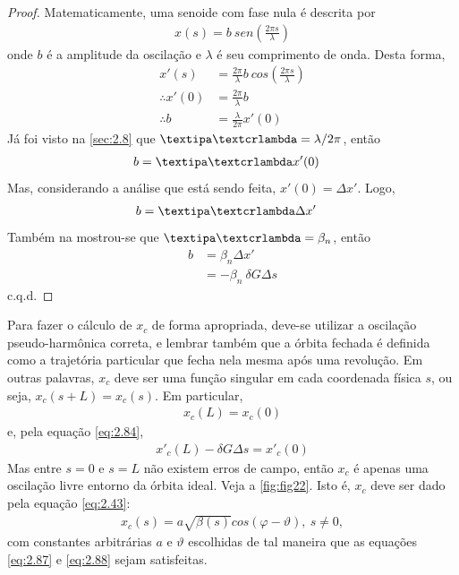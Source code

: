 \begin{proof}
	Matematicamente, uma senoide com fase nula é descrita por
	\begin{align*}
		x(s) = b\ sen\left(\frac{2\pi s}{\lambda}\right)
	\end{align*}
	onde $b$ é a amplitude da oscilação e $\lambda$ é seu comprimento de onda. Desta forma,
	\begin{align*}
		x'(s) &= \frac{2\pi}{\lambda}b\ cos\left(\frac{2\pi s}{\lambda}\right)\\
		\therefore x'(0) & = \frac{2\pi}{\lambda}b\\
		\therefore b &= \frac{\lambda}{2\pi}x'(0)
	\end{align*}
	Já foi visto na \autoref{sec:2.8} que $\lambdabar = \lambda/2\pi$, então
	\begin{align*}
		b &= \lambdabar x'(0)
	\end{align*}
	Mas, considerando a análise que está sendo feita, $x'(0) = \Delta x'$. Logo,
	\begin{align*}
		b &= \lambdabar \Delta x'
	\end{align*}
	Também na  mostrou-se que $\lambdabar = \beta_n$, então
	\begin{align*}
		b &= \beta_n \Delta x'\\
		  &= -\beta_n\ \delta G \Delta s
	\end{align*}
	c.q.d.
\end{proof}

Para fazer o cálculo de $x_c$ de forma apropriada, deve-se utilizar a oscilação pseudo-harmônica correta, e lembrar também que a órbita fechada é definida como a trajetória particular que fecha nela mesma após uma revolução. Em outras palavras, $x_c$ deve ser uma função singular em cada coordenada física $s$, ou seja, $x_c(s+L) = x_c(s)$. Em particular,
\begin{align}
	x_c(L) = x_c(0)\label{eq:2.87}
\end{align}
e, pela equação \eqref{eq:2.84},
\begin{align}
	x'_c(L) - \delta G \Delta s = x'_c(0)\label{eq:2.88}
\end{align}
Mas entre $s=0$ e $s=L$ não existem erros de campo, então $x_c$ é apenas uma oscilação livre entorno da órbita ideal. Veja a \autoref{fig:fig22}. Isto é, $x_c$ deve ser dado pela equação \eqref{eq:2.43}:
\begin{align}
	x_c(s) = a\sqrt{\beta(s)}cos(\varphi - \vartheta),\ s \neq 0,
\end{align}
com constantes arbitrárias $a$ e $\vartheta$ escolhidas de tal maneira que as equações \eqref{eq:2.87} e \eqref{eq:2.88} sejam satisfeitas.

